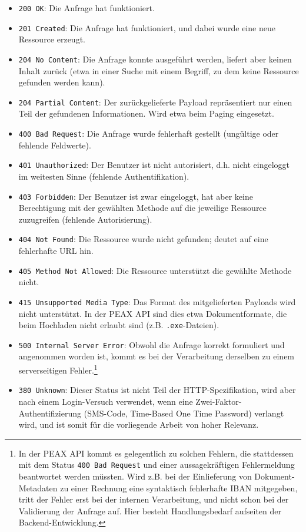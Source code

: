 \begin{itemize}
	\item \texttt{200 OK}: Die Anfrage hat funktioniert.
	\item \texttt{201 Created}: Die Anfrage hat funktioniert, und dabei wurde eine neue Ressource erzeugt.
	\item \texttt{204 No Content}: Die Anfrage konnte ausgeführt werden, liefert aber keinen Inhalt zurück (etwa in einer Suche mit einem Begriff, zu dem keine Ressource gefunden werden kann).
	\item \texttt{204 Partial Content}: Der zurückgelieferte Payload repräsentiert nur einen Teil der gefundenen Informationen. Wird etwa beim Paging eingesetzt.
	\item \texttt{400 Bad Request}: Die Anfrage wurde fehlerhaft gestellt (ungültige oder fehlende Feldwerte).
    \item \texttt{401 Unauthorized}: Der Benutzer ist nicht autorisiert, d.h. nicht eingeloggt im weitesten Sinne (fehlende Authentifikation).
    \item \texttt{403 Forbidden}: Der Benutzer ist zwar eingeloggt, hat aber keine Berechtigung mit der gewählten Methode auf die jeweilige Ressource zuzugreifen (fehlende Autorisierung).
	\item \texttt{404 Not Found}: Die Ressource wurde nicht gefunden; deutet auf eine fehlerhafte URL hin.
	\item \texttt{405 Method Not Allowed}: Die Ressource unterstützt die gewählte Methode nicht.
	\item \texttt{415 Unsupported Media Type}: Das Format des mitgelieferten Payloads wird nicht unterstützt. In der PEAX API sind dies etwa Dokumentformate, die beim Hochladen nicht erlaubt sind (z.B. \texttt{.exe}-Dateien).
	\item \texttt{500 Internal Server Error}: Obwohl die Anfrage korrekt formuliert und angenommen worden ist, kommt es bei der Verarbeitung derselben zu einem serverseitigen Fehler.\footnote{In der PEAX API kommt es gelegentlich zu solchen Fehlern, die stattdessen mit dem Status \texttt{400 Bad Request} und einer aussagekräftigen Fehlermeldung beantwortet werden müssten. Wird z.B. bei der Einlieferung von Dokument-Metadaten zu einer Rechnung eine syntaktisch fehlerhafte IBAN mitgegeben, tritt der Fehler erst bei der internen Verarbeitung, und nicht schon bei der Validierung der Anfrage auf. Hier besteht Handlungsbedarf aufseiten der Backend-Entwicklung.}
	\item \texttt{380 Unknown}: Dieser Status ist nicht Teil der HTTP-Spezifikation, wird aber nach einem Login-Versuch verwendet, wenn eine Zwei-Faktor-Authentifizierung (SMS-Code, Time-Based One Time Password) verlangt wird, und ist somit für die vorliegende Arbeit von hoher Relevanz.
\end{itemize}

